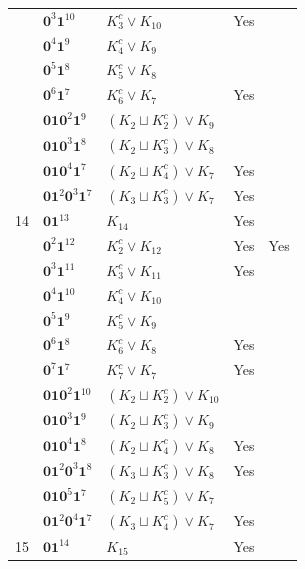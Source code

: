 \documentclass[preprint]{elsarticle}
\begin{document}
\begin{center}
\begin{longtable}{p{0.7cm} p{2cm} p{4cm} p{1cm} p{0cm}}
&$\mathbf{0}^3 \mathbf{1}^{10}$ & $ K_{3}^c \vee K_{10}$ & Yes&\\
&$\mathbf{0}^{4} \mathbf{1}^{9}$ & $ K_{4}^c \vee K_{9}$ & &\\
&$\mathbf{0}^{5} \mathbf{1}^{8}$ & $ K_{5}^c \vee K_{8}$ & &\\
&$\mathbf{0}^6 \mathbf{1}^{7}$ & $ K_{6}^c \vee K_{7}$ & Yes&\\
&$\mathbf{0}\mathbf{1}\mathbf{0}^2 \mathbf{1}^{9}$ & $( K_{2} \sqcup K_{2}^c )\vee K_{9}$ & &\\
&$\mathbf{0}\mathbf{1}\mathbf{0}^3 \mathbf{1}^8$ & $ (K_{2} \sqcup K_{3}^c )\vee K_{8}$ & &\\
&$\mathbf{0}\mathbf{1}\mathbf{0}^{4} \mathbf{1}^{7}$ & $( K_{2} \sqcup K_{4}^c )\vee K_{7}$ & Yes&\\
&$\mathbf{0}\mathbf{1}^2 \mathbf{0}^3 \mathbf{1}^{7}$ & $( K_{3} \sqcup K_{3}^c )\vee K_{7}$ & Yes&\\
\hline
14&$\mathbf{0}\mathbf{1}^{13}$ & $ K_{14}$ & Yes&\\
&$\mathbf{0}^2 \mathbf{1}^{12}$ & $ K_{2}^c \vee K_{12}$ & Yes&Yes\\
&$\mathbf{0}^3 \mathbf{1}^{11}$ & $ K_{3}^c \vee K_{11}$ & Yes&\\
&$\mathbf{0}^4 \mathbf{1}^{10}$ & $ K_{4}^c \vee K_{10}$ & &\\
&$\mathbf{0}^5 \mathbf{1}^{9}$ & $ K_{5}^c \vee K_{9}$ & &\\
&$\mathbf{0}^6 \mathbf{1}^8$ & $ K_{6}^c \vee K_{8}$ & Yes&\\
&$\mathbf{0}^7 \mathbf{1}^7$ & $ K_{7}^c \vee K_{7}$ & Yes&\\
&$\mathbf{0}\mathbf{1}\mathbf{0}^2 \mathbf{1}^{10}$ & $ (K_{2} \sqcup K_{2}^c )\vee K_{10}$ & &\\
&$\mathbf{0}\mathbf{1}\mathbf{0}^3 \mathbf{1}^9$ & $ (K_{2} \sqcup K_{3}^c )\vee K_{9}$ & &\\
&$\mathbf{0}\mathbf{1}\mathbf{0}^4 \mathbf{1}^8$ & $ (K_{2} \sqcup K_{4}^c )\vee K_{8}$ & Yes&\\
&$\mathbf{0}\mathbf{1}^2 \mathbf{0}^3 \mathbf{1}^8$ & $( K_{3} \sqcup K_{3}^c )\vee K_{8}$ & Yes&\\
&$\mathbf{0}\mathbf{1}\mathbf{0}^5 \mathbf{1}^7$ & $ (K_{2} \sqcup K_{5}^c )\vee K_{7}$ & &\\
&$\mathbf{0}\mathbf{1}^2 \mathbf{0}^4 \mathbf{1}^7$ & $( K_{3} \sqcup K_{4}^c )\vee K_{7}$ & Yes&\\
\hline
15&$\mathbf{0}\mathbf{1}^{14}$ & $ K_{15}$ & Yes&\\

\end{longtable}
\end{center}
\end{document}
